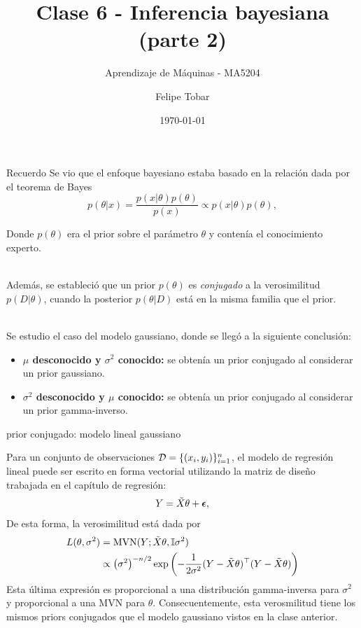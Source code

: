 \documentclass[9pt]{beamer}
\title{Clase 6 - Inferencia bayesiana (parte 2)}
\subtitle{Aprendizaje de Máquinas - MA5204}
\date{\today}
\author{Felipe Tobar}
\institute{Department of Mathematical Engineering \&\\ Center for Mathematical Modelling\\Universidad de Chile}
\begin{document}
\begin{frame}
  \titlepage
\end{frame}

\begin{frame}{Recuerdo}
Se vio que el enfoque bayesiano estaba basado en la relación dada por el teorema de Bayes
	\begin{equation*}
	p(\theta|x) = \frac{p(x|\theta)p(\theta)}{p(x)} \propto p(x|\theta)p(\theta),\label{eq:Bayes}
\end{equation*}

Donde $p(\theta)$ era el prior sobre el parámetro $\theta$ y contenía el conocimiento experto.\\~\ \pause

Además, se estableció que un prior $p(\theta)$ es \emph{conjugado} a la verosimilitud $p(D|\theta)$, cuando la posterior $p(\theta|D)$ está en la misma familia que el prior.\\~\ \pause

Se estudio el caso del modelo gaussiano, donde se llegó a la siguiente conclusión:

\begin{itemize}
	\item \textbf{$\mu$ desconocido y $\sigma^2$ conocido:} se obtenía un prior conjugado al considerar un prior gaussiano.
	\item \textbf{$\sigma^2$ desconocido y $\mu$ conocido:} se obtenía un prior conjugado al considerar un prior gamma-inverso. 
\end{itemize}

\end{frame}

\begin{frame}{prior conjugado: modelo lineal gaussiano}

Para un conjunto de observaciones ${\mathcal D}=\{(x_i,y_i)\}_{i=1}^n$, el modelo de regresión lineal puede ser escrito en forma vectorial utilizando la matriz de diseño trabajada en el capítulo de regresión:
\begin{equation*}
 	Y = \tilde{X}\theta + {\bm \epsilon},
 \end{equation*} \pause
De esta forma, la verosimilitud está dada por 
\begin{align*}
	L(\theta,\sigma^2) &= \operatorname{\text{MVN}}(Y; \tilde{X}\theta, {\mathbb I}\sigma^2)\\
					&\propto \left(\sigma^2\right)^{-n/2}   \exp\left(-\frac{1}{2\sigma^2} (Y - \tilde{X}\theta)^\top(Y - \tilde{X}\theta)\right)\nonumber
\end{align*} \pause
Esta última  expresión es proporcional a una distribución gamma-inversa para $\sigma^2$ y proporcional a una MVN para $\theta$. Consecuentemente, esta verosmilitud tiene los mismos priors conjugados que el modelo gaussiano vistos en la clase anterior. 
	
\end{frame}
\end{document}
